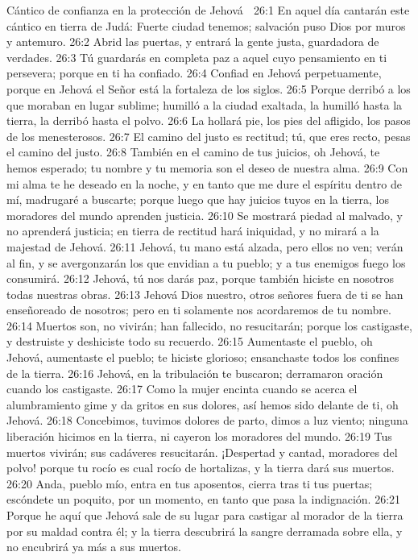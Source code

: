 Cántico de confianza en la protección de Jehová  

26:1 En aquel día cantarán este cántico en tierra de Judá: Fuerte ciudad tenemos; salvación puso Dios por muros y antemuro.  
26:2 Abrid las puertas, y entrará la gente justa, guardadora de verdades.  
26:3 Tú guardarás en completa paz a aquel cuyo pensamiento en ti persevera; porque en ti ha confiado.  
26:4 Confiad en Jehová perpetuamente, porque en Jehová el Señor está la fortaleza de los siglos.  
26:5 Porque derribó a los que moraban en lugar sublime; humilló a la ciudad exaltada, la humilló hasta la tierra, la derribó hasta el polvo.  
26:6 La hollará pie, los pies del afligido, los pasos de los menesterosos.  
26:7 El camino del justo es rectitud; tú, que eres recto, pesas el camino del justo.  
26:8 También en el camino de tus juicios, oh Jehová, te hemos esperado; tu nombre y tu memoria son el deseo de nuestra alma.  
26:9 Con mi alma te he deseado en la noche, y en tanto que me dure el espíritu dentro de mí, madrugaré a buscarte; porque luego que hay juicios tuyos en la tierra, los moradores del mundo aprenden justicia.  
26:10 Se mostrará piedad al malvado, y no aprenderá justicia; en tierra de rectitud hará iniquidad, y no mirará a la majestad de Jehová.  
26:11 Jehová, tu mano está alzada, pero ellos no ven; verán al fin, y se avergonzarán los que envidian a tu pueblo; y a tus enemigos fuego los consumirá. 
26:12 Jehová, tú nos darás paz, porque también hiciste en nosotros todas nuestras obras.  
26:13 Jehová Dios nuestro, otros señores fuera de ti se han enseñoreado de nosotros; pero en ti solamente nos acordaremos de tu nombre.  
26:14 Muertos son, no vivirán; han fallecido, no resucitarán; porque los castigaste, y destruiste y deshiciste todo su recuerdo.  
26:15 Aumentaste el pueblo, oh Jehová, aumentaste el pueblo; te hiciste glorioso; ensanchaste todos los confines de la tierra.  
26:16 Jehová, en la tribulación te buscaron; derramaron oración cuando los castigaste.  
26:17 Como la mujer encinta cuando se acerca el alumbramiento gime y da gritos en sus dolores, así hemos sido delante de ti, oh Jehová.  
26:18 Concebimos, tuvimos dolores de parto, dimos a luz viento; ninguna liberación hicimos en la tierra, ni cayeron los moradores del mundo.  
26:19 Tus muertos vivirán; sus cadáveres resucitarán. ¡Despertad y cantad, moradores del polvo! porque tu rocío es cual rocío de hortalizas, y la tierra dará sus muertos.  
26:20 Anda, pueblo mío, entra en tus aposentos, cierra tras ti tus puertas; escóndete un poquito, por un momento, en tanto que pasa la indignación.  
26:21 Porque he aquí que Jehová sale de su lugar para castigar al morador de la tierra por su maldad contra él; y la tierra descubrirá la sangre derramada sobre ella, y no encubrirá ya más a sus muertos.  

